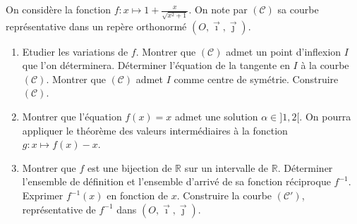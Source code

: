       \begin{exo}
      On consid\`ere la fonction $f:x\mapsto 1+\frac{x}{\sqrt{x^2 + 1}}$.
      On note par $(\mathscr{C})$ sa courbe repr\'esentative dans un rep\`ere orthonorm\'e $(O,\vec{\imath},\vec{\jmath})$.
      \begin{enumerate}
            \item 
                              Etudier les variations de $f$.
                              Montrer que $(\mathscr{C})$ admet un point d'inflexion $I$ que l'on d\'eterminera.
                              D\'eterminer l'\'equation de la tangente en $I$ \`a la courbe $(\mathscr{C})$.
                              Montrer que $(\mathscr{C})$ admet $I$ comme centre de sym\'etrie.
                              Construire $(\mathscr{C})$.
            \item Montrer que l'\'equation $f(x) = x$ admet une solution $\alpha \in ]1,2[$.
                  On pourra appliquer le th\'eor\`eme des valeurs interm\'ediaires \`a la fonction $g : x \mapsto f(x) - x$.
            \item 
                              Montrer que $f$ est une bijection de $\mathbb{R}$ sur un intervalle de $\mathbb{R}$.
                              D\'eterminer l'ensemble de d\'efinition et l'ensemble d'arriv\'e de 
                              sa fonction r\'eciproque $f^{-1}$.
                              Exprimer $f^{-1}(x)$ en fonction de $x$.
                              Construire la courbe $(\mathscr{C}')$, repr\'esentative de $f^{-1}$ 
                              dans $(O,\vec{\imath},\vec{\jmath})$.            
      \end{enumerate}
      \end{exo}
